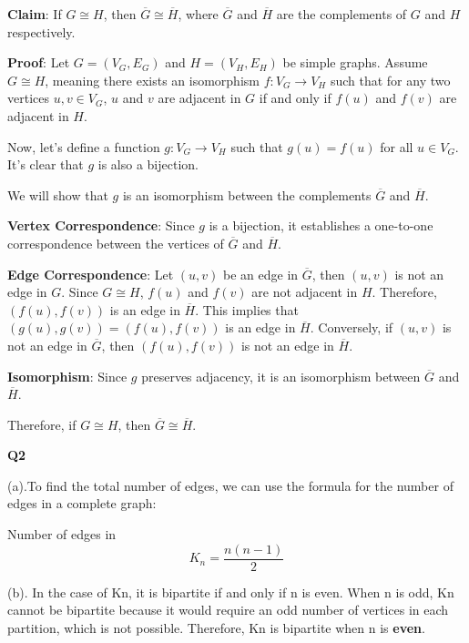 \documentclass{article}
\begin{document}
\textbf{Claim}: If $G \cong H$, then $\overline{G} \cong \overline{H}$, where $\overline{G}$ and $\overline{H}$ are the complements of $G$ and $H$ respectively.

\textbf{Proof}: Let $G = (V_G, E_G)$ and $H = (V_H, E_H)$ be simple graphs. Assume $G \cong H$, meaning there exists an isomorphism $f: V_G \rightarrow V_H$ such that for any two vertices $u, v \in V_G$, $u$ and $v$ are adjacent in $G$ if and only if $f(u)$ and $f(v)$ are adjacent in $H$. 

Now, let's define a function $g: V_G \rightarrow V_H$ such that $g(u) = f(u)$ for all $u \in V_G$. It's clear that $g$ is also a bijection.

We will show that $g$ is an isomorphism between the complements $\overline{G}$ and $\overline{H}$.

\textbf{Vertex Correspondence}: Since $g$ is a bijection, it establishes a one-to-one correspondence between the vertices of $\overline{G}$ and $\overline{H}$.

\textbf{Edge Correspondence}: Let $(u, v)$ be an edge in $\overline{G}$, then $(u, v)$ is not an edge in $G$. Since $G \cong H$, $f(u)$ and $f(v)$ are not adjacent in $H$. Therefore, $(f(u), f(v))$ is an edge in $\overline{H}$. This implies that $(g(u), g(v)) = (f(u), f(v))$ is an edge in $\overline{H}$. Conversely, if $(u, v)$ is not an edge in $\overline{G}$, then $(f(u), f(v))$ is not an edge in $\overline{H}$.

\textbf{Isomorphism}: Since $g$ preserves adjacency, it is an isomorphism between $\overline{G}$ and $\overline{H}$.

Therefore, if $G \cong H$, then $\overline{G} \cong \overline{H}$.

\textbf{Q2}

(a).To find the total number of edges, we can use the formula for the number of edges in a complete graph:

Number of edges in \[K_n =  \frac{n(n-1)}{2} \]

(b).
In the case of Kn, it is bipartite if and only if n is even. When n is odd, Kn cannot be bipartite because it would require an odd number of vertices in each partition, which is not possible. Therefore, Kn is bipartite when n is \textbf{even}.
\end{document}
